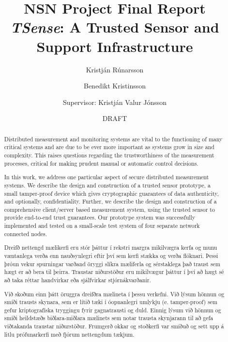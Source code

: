 \documentclass[10pt,titlepage,twoside,a4paper]{report}
\author{Kristj\'{a}n R\'{u}narsson \and Benedikt Kristinsson\\\and Supervisor: Kristj\'{a}n Valur J\'{o}nsson}
\title{NSN Project Final Report\\\textit{TSense}: A Trusted Sensor and Support Infrastructure}
\date{DRAFT}
\begin{document}
\maketitle
\begin{titlepage}
\end{titlepage}
\newpage
\ \ \ \\
\newpage

\setcounter{page}{1}

\tableofcontents

\begin{abstract}
Distributed measurement and monitoring systems are vital to the functioning of many critical systems and are due to be ever more important as systems grow in size and complexity. This raises questions regarding the trustworthiness of the measurement processes, critical for making prudent manual or automatic control decisions. 

In this work, we address one particular aspect of secure distributed measurement systems. We describe the design and construction of a trusted sensor prototype, a small tamper-proof device which gives cryptographic guarantees of data authenticity, and optionally, confidentiality. Further, we describe the design and construction of a comprehensive client/server based measurement system, using the trusted sensor to provide end-to-end trust guarantees.
%
Our prototype system was successfully implemented and tested on a small-scale test system of four separate network connected nodes.
\end{abstract}

\renewcommand{\abstractname}{{\'{U}}tdr\'{a}ttur}
\begin{abstract}
Dreifð nettengd mælikerfi eru stór þáttur í rekstri margra mikilvægra kerfa og munu væntanlega verða enn nauðsynlegri eftir því sem kerfi stækka og verða flóknari. Þessi þróun vekur spurningar varðand öryggi slíkra mæliferla og sérstaklega það traust sem hægt er að bera til þeirra. Traustar niðurstöður eru mikilvægur þáttur í því að hægt sé að taka réttar handvirkar eða sjálfvirkar stjórnákvarðanir.

Við skoðum einn þátt öruggra dreifðra mælineta í þessu verkefni. Við lýsum hönnun og smíði trausts skynara, sem er lítið tæki í óopnanlegri umlykju (e. tamper-proof) sem gefur kriptografíska tryggingu fyrir gagnatrausti og duld. Einnig lýsum við hönnun og smíði heildstæðs biðlara-miðlara mælinets sem  notar trausta skynjarann til að gefa viðtakanda traustar niðurstöður.
%
Frumgerð okkar og stoðkerfi var smíðuð og sett upp á litlu prófunarkerfi með fjórum nettengdum tækjum.
\end{abstract}

\setcounter{page}{1}
\pagestyle{headings}








\end{document}
